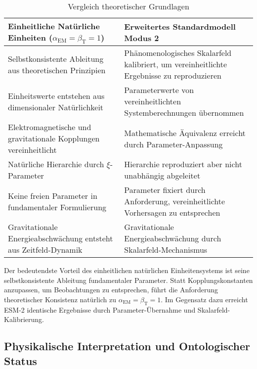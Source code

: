 \documentclass[12pt,a4paper]{article}
\newcommand{\alphaEM}{\alpha_{\text{EM}}}
\newcommand{\betaT}{\beta_{\text{T}}}
\newcommand{\xipar}{\xi}
\begin{document}
	\begin{table}[ht]
		\centering
		\caption{Vergleich theoretischer Grundlagen}
		\label{tab:theoretical_foundations}
		\begin{tabular}{p{}|p{}}
			\hline
			\textbf{Einheitliche Natürliche Einheiten ($\alphaEM = \betaT = 1$)} & \textbf{Erweitertes Standardmodell Modus 2} \\
			\hline
			Selbstkonsistente Ableitung aus theoretischen Prinzipien & Phänomenologisches Skalarfeld kalibriert, um vereinheitlichte Ergebnisse zu reproduzieren \\
			\hline
			Einheitswerte entstehen aus dimensionaler Natürlichkeit & Parameterwerte von vereinheitlichten Systemberechnungen übernommen \\
			\hline
			Elektromagnetische und gravitationale Kopplungen vereinheitlicht & Mathematische Äquivalenz erreicht durch Parameter-Anpassung \\
			\hline
			Natürliche Hierarchie durch $\xipar$-Parameter & Hierarchie reproduziert aber nicht unabhängig abgeleitet \\
			\hline
			Keine freien Parameter in fundamentaler Formulierung & Parameter fixiert durch Anforderung, vereinheitlichte Vorhersagen zu entsprechen \\
			\hline
			Gravitationale Energieabschwächung entsteht aus Zeitfeld-Dynamik & Gravitationale Energieabschwächung durch Skalarfeld-Mechanismus \\
			\hline
		\end{tabular}
	\end{table}
	
	Der bedeutendste Vorteil des einheitlichen natürlichen Einheitensystems ist seine selbstkonsistente Ableitung fundamentaler Parameter. Statt Kopplungskonstanten anzupassen, um Beobachtungen zu entsprechen, führt die Anforderung theoretischer Konsistenz natürlich zu $\alphaEM = \betaT = 1$. Im Gegensatz dazu erreicht ESM-2 identische Ergebnisse durch Parameter-Übernahme und Skalarfeld-Kalibrierung.
	
	\subsection{Physikalische Interpretation und Ontologischer Status}
	\label{subsec:physical_interpretation_ontological}
	
\end{document}
